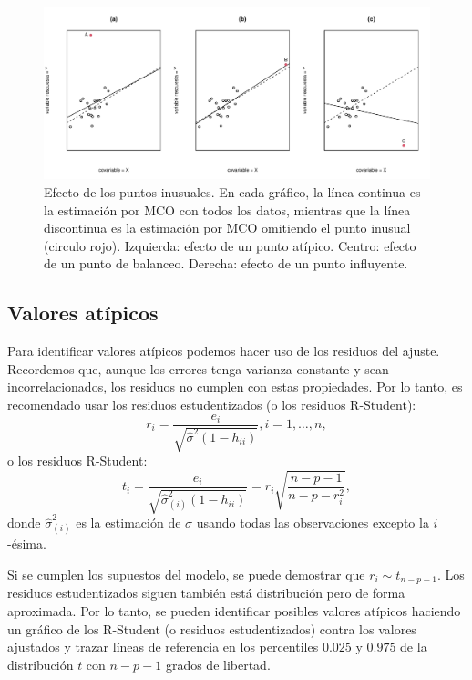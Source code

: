 \documentclass[
]{article}
\begin{document}
\begin{figure}

{\centering \includegraphics{MLG1_files/figure-latex/puntosAIw-1} 

}

\caption{Efecto de los puntos inusuales. En cada gráfico, la línea continua es la estimación por MCO con todos los datos, mientras que la línea discontinua es la estimación por MCO omitiendo el punto inusual (circulo rojo). Izquierda: efecto de un punto atípico. Centro: efecto de un punto de balanceo. Derecha: efecto de un punto influyente.}\label{fig:puntosAIw}
\end{figure}

\hypertarget{valores-atuxedpicos}{%
\subsection{Valores atípicos}\label{valores-atuxedpicos}}

Para identificar valores atípicos podemos hacer uso de los residuos del ajuste. Recordemos que, aunque los errores tenga varianza constante y sean incorrelacionados, los residuos no cumplen con estas propiedades. Por lo tanto, es recomendado usar los residuos estudentizados (o los residuos R-Student):
\[
r_{i} = \frac{e_{i}}{\sqrt{\widehat{\sigma}^{2}(1-h_{ii})}}, i=1,\ldots,n,
\]
o los residuos R-Student:
\[
t_{i} = \frac{e_{i}}{\sqrt{\widehat{\sigma}^{2}_{(i)}(1-h_{ii})}} = r_{i} \sqrt{\frac{n-p-1}{n-p-r_{i}^{2}}},
\]
donde \(\widehat{\sigma}^{2}_{(i)}\) es la estimación de \(\sigma\) usando todas las observaciones excepto la \(i\)-ésima.

Si se cumplen los supuestos del modelo, se puede demostrar que \(r_{i}\sim t_{n-p-1}\). Los residuos estudentizados siguen también está distribución pero de forma aproximada. Por lo tanto, se pueden identificar posibles valores atípicos haciendo un gráfico de los R-Student (o residuos estudentizados) contra los valores ajustados y trazar líneas de referencia en los percentiles \(0.025\) y \(0.975\) de la distribución \(t\) con \(n-p-1\) grados de libertad.
\end{document}
